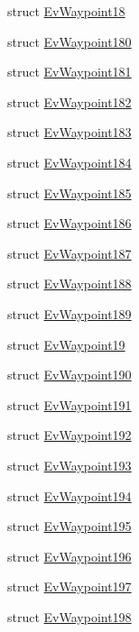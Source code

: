\begin{DoxyCompactItemize}
struct \hyperlink{structcl__move__base__z_1_1EvWaypoint18}{Ev\+Waypoint18}
\item 
struct \hyperlink{structcl__move__base__z_1_1EvWaypoint180}{Ev\+Waypoint180}
\item 
struct \hyperlink{structcl__move__base__z_1_1EvWaypoint181}{Ev\+Waypoint181}
\item 
struct \hyperlink{structcl__move__base__z_1_1EvWaypoint182}{Ev\+Waypoint182}
\item 
struct \hyperlink{structcl__move__base__z_1_1EvWaypoint183}{Ev\+Waypoint183}
\item 
struct \hyperlink{structcl__move__base__z_1_1EvWaypoint184}{Ev\+Waypoint184}
\item 
struct \hyperlink{structcl__move__base__z_1_1EvWaypoint185}{Ev\+Waypoint185}
\item 
struct \hyperlink{structcl__move__base__z_1_1EvWaypoint186}{Ev\+Waypoint186}
\item 
struct \hyperlink{structcl__move__base__z_1_1EvWaypoint187}{Ev\+Waypoint187}
\item 
struct \hyperlink{structcl__move__base__z_1_1EvWaypoint188}{Ev\+Waypoint188}
\item 
struct \hyperlink{structcl__move__base__z_1_1EvWaypoint189}{Ev\+Waypoint189}
\item 
struct \hyperlink{structcl__move__base__z_1_1EvWaypoint19}{Ev\+Waypoint19}
\item 
struct \hyperlink{structcl__move__base__z_1_1EvWaypoint190}{Ev\+Waypoint190}
\item 
struct \hyperlink{structcl__move__base__z_1_1EvWaypoint191}{Ev\+Waypoint191}
\item 
struct \hyperlink{structcl__move__base__z_1_1EvWaypoint192}{Ev\+Waypoint192}
\item 
struct \hyperlink{structcl__move__base__z_1_1EvWaypoint193}{Ev\+Waypoint193}
\item 
struct \hyperlink{structcl__move__base__z_1_1EvWaypoint194}{Ev\+Waypoint194}
\item 
struct \hyperlink{structcl__move__base__z_1_1EvWaypoint195}{Ev\+Waypoint195}
\item 
struct \hyperlink{structcl__move__base__z_1_1EvWaypoint196}{Ev\+Waypoint196}
\item 
struct \hyperlink{structcl__move__base__z_1_1EvWaypoint197}{Ev\+Waypoint197}
\item 
struct \hyperlink{structcl__move__base__z_1_1EvWaypoint198}{Ev\+Waypoint198}
\item 

\end{DoxyCompactItemize}
